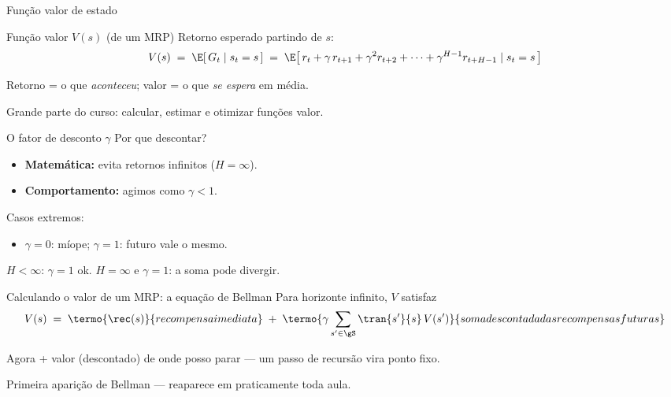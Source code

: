 \documentclass[aspectratio=169, 11pt]{beamer}
\begin{document}
\begin{frame}{Função valor de estado}
  \begin{defbox}{Função valor $V(s)$ (de um MRP)}
    Retorno esperado partindo de $s$:
    \[
      V(s) \;=\; \E[\, G_t \mid s_t = s \,]
           \;=\; \E\bigl[\, r_t + \gamma\, r_{t+1} + \gamma^2 r_{t+2}
                 + \cdots + \gamma^{H-1} r_{t+H-1} \mid s_t = s \,\bigr]
    \]
  \end{defbox}

  \begin{ideiabox}
    Retorno = o que \emph{aconteceu}; valor = o que \emph{se espera} em média.
  \end{ideiabox}

  {\small\color{rlCinza} Grande parte do curso: calcular, estimar e otimizar funções valor.}
\end{frame}

\begin{frame}{O fator de desconto $\gamma$}
  Por que descontar?
  \begin{itemize}
    \item \textbf{Matemática:} evita retornos infinitos ($H = \infty$).
    \item \textbf{Comportamento:} agimos como $\gamma < 1$.
  \end{itemize}

  \medskip
  Casos extremos:
  \begin{itemize}
    \item $\gamma = 0$: míope; $\gamma = 1$: futuro vale o mesmo.
  \end{itemize}

  \begin{alertabox}
    $H < \infty$: $\gamma = 1$ ok. $H = \infty$ e $\gamma = 1$: a soma pode divergir.
  \end{alertabox}
\end{frame}

\begin{frame}{Calculando o valor de um MRP: a equação de Bellman}
  Para horizonte infinito, $V$ satisfaz
  \[
    V(s) \;=\; \termo{\rec(s)}{recompensa imediata}
      \;+\; \termo{\gamma \sum_{s' \in \gS} \tran{s'}{s}\, V(s')}%
                  {soma descontada das recompensas futuras}
  \]

  \begin{ideiabox}
    Agora + valor (descontado) de onde posso parar — um passo de recursão vira ponto fixo.
  \end{ideiabox}

  {\small\color{rlCinza} Primeira aparição de Bellman — reaparece em praticamente toda aula.}
\end{frame}
\end{document}
